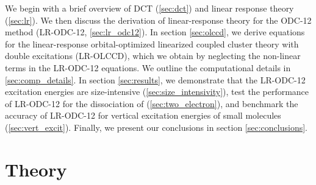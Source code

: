 We begin with a brief overview of DCT (\cref{sec:dct}) and linear response
theory (\cref{sec:lr}). We then discuss the derivation of linear-response
theory for the ODC-12 method (LR-ODC-12, \cref{sec:lr_odc12}).
In section \cref{sec:olccd}, 
we derive equations for the linear-response orbital-optimized linearized
coupled cluster theory with double excitations (LR-OLCCD), which we obtain by
neglecting the non-linear terms in the LR-ODC-12 equations. 
We outline the
computational details in \cref{sec:comp_details}.
In section \cref{sec:results}, we demonstrate that the LR-ODC-12 excitation
energies are size-intensive (\cref{sec:size_intensivity}), test the performance
of LR-ODC-12 for the dissociation of  (\cref{sec:two_electron}), and
benchmark the accuracy of LR-ODC-12 for vertical
excitation energies of small molecules (\cref{sec:vert_excit}).
Finally, we present our conclusions in section \cref{sec:conclusions}.


\section{Theory}

